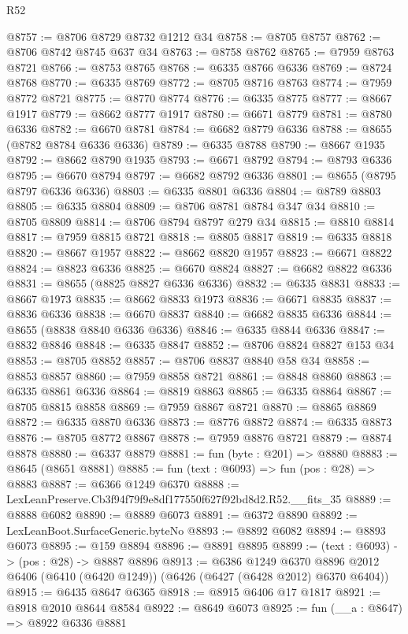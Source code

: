 \begin{lexlean}{R52}
\begin{coremodule}
@8757 := @8706 @8729 @8732 @1212 @34
@8758 := @8705 @8757
@8762 := @8706 @8742 @8745 @637 @34
@8763 := @8758 @8762
@8765 := @7959 @8763 @8721
@8766 := @8753 @8765
@8768 := @6335 @8766 @6336
@8769 := @8724 @8768
@8770 := @6335 @8769
@8772 := @8705 @8716 @8763
@8774 := @7959 @8772 @8721
@8775 := @8770 @8774
@8776 := @6335 @8775
@8777 := @8667 @1917
@8779 := @8662 @8777 @1917
@8780 := @6671 @8779
@8781 := @8780 @6336
@8782 := @6670 @8781
@8784 := @6682 @8779 @6336
@8788 := @8655 (@8782 @8784 @6336 @6336)
@8789 := @6335 @8788
@8790 := @8667 @1935
@8792 := @8662 @8790 @1935
@8793 := @6671 @8792
@8794 := @8793 @6336
@8795 := @6670 @8794
@8797 := @6682 @8792 @6336
@8801 := @8655 (@8795 @8797 @6336 @6336)
@8803 := @6335 @8801 @6336
@8804 := @8789 @8803
@8805 := @6335 @8804
@8809 := @8706 @8781 @8784 @347 @34
@8810 := @8705 @8809
@8814 := @8706 @8794 @8797 @279 @34
@8815 := @8810 @8814
@8817 := @7959 @8815 @8721
@8818 := @8805 @8817
@8819 := @6335 @8818
@8820 := @8667 @1957
@8822 := @8662 @8820 @1957
@8823 := @6671 @8822
@8824 := @8823 @6336
@8825 := @6670 @8824
@8827 := @6682 @8822 @6336
@8831 := @8655 (@8825 @8827 @6336 @6336)
@8832 := @6335 @8831
@8833 := @8667 @1973
@8835 := @8662 @8833 @1973
@8836 := @6671 @8835
@8837 := @8836 @6336
@8838 := @6670 @8837
@8840 := @6682 @8835 @6336
@8844 := @8655 (@8838 @8840 @6336 @6336)
@8846 := @6335 @8844 @6336
@8847 := @8832 @8846
@8848 := @6335 @8847
@8852 := @8706 @8824 @8827 @153 @34
@8853 := @8705 @8852
@8857 := @8706 @8837 @8840 @58 @34
@8858 := @8853 @8857
@8860 := @7959 @8858 @8721
@8861 := @8848 @8860
@8863 := @6335 @8861 @6336
@8864 := @8819 @8863
@8865 := @6335 @8864
@8867 := @8705 @8815 @8858
@8869 := @7959 @8867 @8721
@8870 := @8865 @8869
@8872 := @6335 @8870 @6336
@8873 := @8776 @8872
@8874 := @6335 @8873
@8876 := @8705 @8772 @8867
@8878 := @7959 @8876 @8721
@8879 := @8874 @8878
@8880 := @6337 @8879
@8881 := fun (byte : @201) => @8880
@8883 := @8645 (@8651 @8881)
@8885 := fun (text : @6093) => fun (pos : @28) => @8883
@8887 := @6366 @1249 @6370
@8888 := LexLeanPreserve.Cb3f94f79f9e8df177550f627f92bd8d2.R52.__fits_35
@8889 := @8888 @6082
@8890 := @8889 @6073
@8891 := @6372 @8890
@8892 := LexLeanBoot.SurfaceGeneric.byteNo
@8893 := @8892 @6082
@8894 := @8893 @6073
@8895 := @159 @8894
@8896 := @8891 @8895
@8899 := (text : @6093) -> (pos : @28) -> @8887 @8896
@8913 := @6386
    @1249
    @6370
    @8896
    @2012
    @6406
    (@6410 (@6420 @1249))
    (@6426 (@6427 (@6428 @2012) @6370 @6404))
@8915 := @6435 @8647 @6365
@8918 := @8915 @6406 @17 @1817
@8921 := @8918 @2010 @8644 @8584
@8922 := @8649 @6073
@8925 := fun (__a : @8647) => @8922 @6336 @8881

\end{coremodule}
\end{lexlean}
